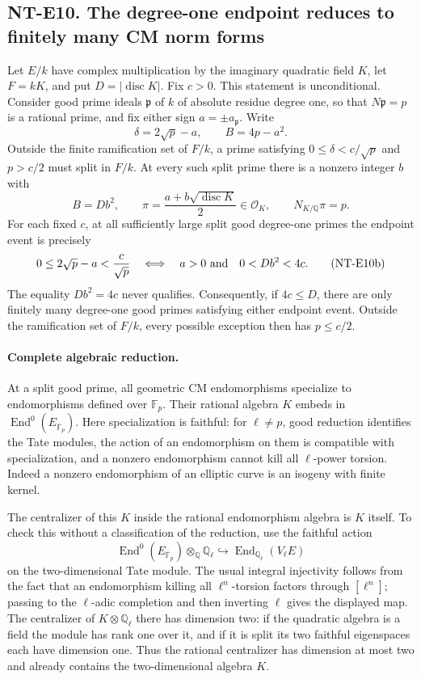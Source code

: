 \subsection*{NT-E10. The degree-one endpoint reduces to finitely many CM norm forms}
Let $E/k$ have complex multiplication by the imaginary quadratic
field $K$, let $F=kK$, and put $D=|\operatorname{disc}K|$.
Fix $c>0$. This statement is unconditional. Consider good prime
ideals $\mathfrak p$ of $k$ of absolute residue degree one, so that
$N\mathfrak p=p$ is a rational prime, and fix either sign
$a=\pm a_{\mathfrak p}$. Write
\[
 \delta=2\sqrt p-a,\qquad B=4p-a^2 .
\]
Outside the finite ramification set of $F/k$, a prime satisfying
$0\le\delta<c/\sqrt p$ and $p>c/2$ must split in $F/k$.
At every such split prime there is a nonzero integer $b$ with
\[
 B=Db^2,\qquad
 \pi=\frac{a+b\sqrt{\operatorname{disc}K}}2\in\mathcal O_K,\qquad
 N_{K/\mathbb Q}\pi=p.                                  \tag{NT-E10a}
\]
For each fixed $c$, at all sufficiently large split good
degree-one primes the endpoint event is precisely
\[
 0\le2\sqrt p-a<\frac c{\sqrt p}
 \quad\Longleftrightarrow\quad
 a>0\ \hbox{and}\quad 0<Db^2<4c.                        \tag{NT-E10b}
\]
The equality $Db^2=4c$ never qualifies. Consequently, if $4c\le D$,
there are only finitely many degree-one good primes satisfying
either endpoint event. Outside the ramification set of $F/k$,
every possible exception then has $p\le c/2$.

\paragraph{Complete algebraic reduction.}
At a split good prime, all geometric CM endomorphisms specialize
to endomorphisms defined over $\mathbb F_p$. Their rational algebra
$K$ embeds in $\operatorname{End}^0(E_{\overline{\mathbb F}_p})$.
Here specialization is faithful: for $\ell\ne p$, good reduction
identifies the Tate modules, the action of an endomorphism on them
is compatible with specialization, and a nonzero endomorphism
cannot kill all $\ell$-power torsion. Indeed a nonzero endomorphism
of an elliptic curve is an isogeny with finite kernel.

The centralizer of this $K$ inside the rational endomorphism
algebra is $K$ itself. To check this without a classification of
the reduction, use the faithful action
\[
 \operatorname{End}^0(E_{\overline{\mathbb F}_p})
      \otimes_{\mathbb Q}\mathbb Q_\ell
       \hookrightarrow\operatorname{End}_{\mathbb Q_\ell}(V_\ell E)
\]
on the two-dimensional Tate module. The usual integral
injectivity follows from the fact that an endomorphism killing
all $\ell^n$-torsion factors through $[\ell^n]$; passing to the
$\ell$-adic completion and then inverting $\ell$ gives the displayed
map. The centralizer of
$K\otimes\mathbb Q_\ell$ there has dimension two: if the quadratic
algebra is a field the module has rank one over it, and if it is
split its two faithful eigenspaces each have dimension one.
Thus the rational centralizer has dimension at most two and
already contains the two-dimensional algebra $K$.

